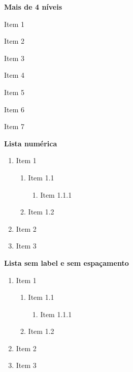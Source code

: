 \documentclass[12pt,a4paper]{article}
\begin{document}
\noindent\textbf{Mais de 4 níveis}
\begin{customEnumerate}
	\item Item 1

	\begin{customEnumerate}
		\item Item 2
		\begin{customEnumerate}
			\item Item 3
			\begin{customEnumerate}
				\item Item 4
				\begin{customEnumerate}
					\item Item 5
				\end{customEnumerate}
			\end{customEnumerate}
		\end{customEnumerate}
	\end{customEnumerate}

	\item \par Item 6
	\item \par Item 7
\end{customEnumerate}

\noindent\textbf{Lista numérica}
\begin{enumerate}[label=\arabic*]	
	\item Item 1
	\begin{enumerate}[label=\arabic*]	
		\item Item 1.1
		\begin{enumerate}[label=\arabic*]	
			\item Item 1.1.1
		\end{enumerate}
		\item Item 1.2
	\end{enumerate}
	\item Item 2
	\item Item 3
\end{enumerate}

\noindent\textbf{Lista sem label e sem espaçamento}
\begin{enumerate}[label={},leftmargin=*,topsep=0cm,itemsep=0cm,parsep=0cm,labelsep=0cm]
	\item Item 1
	\begin{enumerate}[label={},leftmargin=*,topsep=0cm,itemsep=0cm,parsep=0cm,labelsep=0cm]
		\item Item 1.1
		\begin{enumerate}[label={},leftmargin=*,topsep=0cm,itemsep=0cm,parsep=0cm,labelsep=0cm]
			\item Item 1.1.1
		\end{enumerate}
		\item Item 1.2
	\end{enumerate}
	\item Item 2
	\item Item 3
\end{enumerate}
\end{document}
